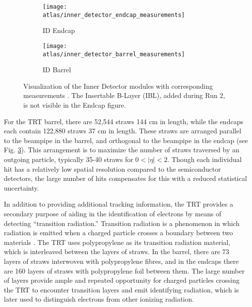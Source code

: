            \begin{figure}
                \begin{subfigure}{.48\textwidth}
                    \texttt{[image: atlas/inner\_detector\_endcap\_measurements]}
                    \caption{ID Endcap}
                    \label{fig:inner_detector_endcap_measurements}
                \end{subfigure}
                \begin{subfigure}{.48\textwidth}
                    \texttt{[image: atlas/inner\_detector\_barrel\_measurements]}
                    \caption{ID Barrel}
                    \label{fig:inner_detector_barrel_measurements}
                \end{subfigure}
                \caption{Visualization of the Inner Detector modules with corresponding measurements \cite{atlas_tdr} \cite{sensor_damage}.
                    The Insertable B-Layer (IBL), added during Run 2, is not visible in the Endcap figure.}
                \label{fig:inner_detector_measurements}
            \end{figure}

            For the TRT barrel, there are 52,544 straws 144 cm in length, while the endcaps each contain 122,880 straws 37 cm in length.
            These straws are arranged parallel to the beampipe in the barrel, and orthogonal to the beampipe in the endcap (see Fig. \ref{fig:inner_detector_measurements}).
            This arrangement is to maximize the number of straws traversed by an outgoing particle, typically 35-40 straws for $0 < |\eta| < 2$.
            Though each individual hit has a relatively low spatial resolution compared to the semiconductor detectors, the large number of hits compensates for this with a reduced statistical uncertainty.

            In addition to providing additional tracking information, the TRT provides a secondary purpose of aiding in the identification of electrons by means of detecting ``transition radiation.''
            Transition radiation is a phenomenon in which radiation is emitted when a charged particle crosses a boundary between two materials \cite{transition_radiation}.
            The TRT uses polypropylene as its transition radiation material, which is interleaved between the layers of straws.
            In the barrel, there are 73 layers of straws interwoven with polypropylene fibres, and in the endcaps there are 160 layers of straws with polypropylene foil between them.
            The large number of layers provide ample and repeated opportunity for charged particles crossing the TRT to encounter transition layers and emit identifying radiation, which is later used to distinguish electrons from other ionizing radiation.


